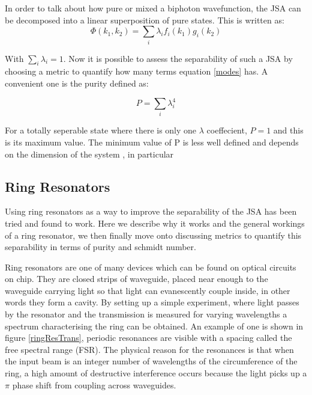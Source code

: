 In order to talk about how pure or mixed a biphoton wavefunction, the JSA can be decomposed into a linear superposition of pure states. This is written as\cite{harder_optimized_2013}:
\begin{equation} \label{modes}
	\Phi(k_1,k_2) = \sum_i \lambda_if_i(k_1)g_i(k_2)
\end{equation}

With $\sum_i \lambda_i=1$. Now it is possible to assess the separability of such a JSA by choosing a metric to quantify how many terms  equation \ref{modes} has. A convenient one is the purity defined as: 

\begin{equation} \label{purityEqn}
	P = \sum_i \lambda_i^4
\end{equation}

For a totally seperable state where there is only one $\lambda$ coeffecient, $P=1$ and this is its maximum value. The minimum value of P is less well defined and depends on the dimension of the system , in particular 




\subsection{Ring Resonators}
Using ring resonators as a way to improve the separability of the JSA has been tried and found to work. Here we describe why it works and the general workings of a ring resonator, we then finally move onto discussing metrics to quantify this separability in terms of purity and schmidt number.


Ring resonators are one of many devices which can be found on optical circuits on chip. They are closed strips of waveguide, placed near enough to the waveguide carrying light so that light can evanescently couple inside, in other words they form a cavity. By setting up a simple experiment, where light passes by the resonator and the transmission is measured for varying wavelengths a spectrum characterising the ring can be obtained. An example of one is shown in figure \ref{ringResTrans}, periodic resonances are visible with a spacing called the free spectral range (FSR). The physical reason for the resonances is that when the input beam is an integer number of wavelengths of the circumference of the ring, a high amount of destructive interference occurs because the light picks up a $\pi$ phase shift from coupling across waveguides.

